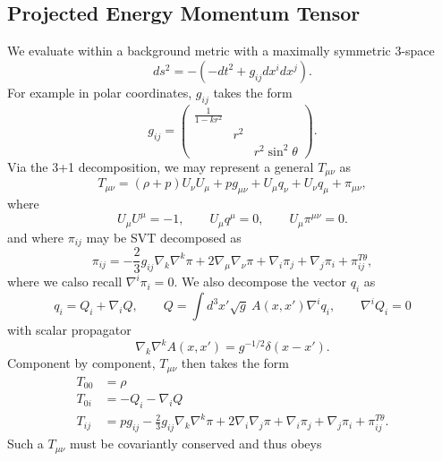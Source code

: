 \documentclass[10pt,letterpaper]{article}
\numberwithin{equation}{subsection}
\begin{document}
\subsection{Projected Energy Momentum Tensor}
We evaluate within a background metric with a maximally symmetric 3-space
\begin{equation}
ds^2 = -( -dt^2 + g_{ij}dx^i dx^j ).
\end{equation}
For example in polar coordinates, $g_{ij}$ takes the form
\begin{equation}
g_{ij} = 
\begin{pmatrix}
\frac{1}{1-kr^2}& & \\
& r^2 & \\
& & r^2\sin^2\theta
\end{pmatrix}.
\end{equation}
Via the 3+1 decomposition, we may represent a general $T_{\mu\nu}$ as
\begin{equation}
T_{\mu\nu} = (\rho+p)U_\nu U_\mu + pg_{\mu\nu} +U_\mu q_\nu + U_\nu q_\mu + \pi_{\mu\nu},
\end{equation}
where
\begin{equation}
U_\mu U^\mu = -1,\qquad U_\mu q^\mu = 0,\qquad U_\mu \pi^{\mu\nu} = 0. 
\end{equation}
and where $\pi_{ij}$ may be SVT decomposed as
\begin{equation}
\pi_{ij} = -\frac{2}{3}g_{ij} \nabla_k \nabla^k \pi + 2\nabla_\mu\nabla_\nu \pi +\nabla_i \pi_j +\nabla_j \pi_i + \pi_{ij}^{T\theta},
\end{equation}
where we calso recall $\nabla^i \pi_i = 0$. We also decompose the vector $q_i$ as
\begin{equation}
q_i = Q_i + \nabla_i Q,\qquad Q = \int d^3x' \sqrt g\ A(x,x') \nabla^i q_i,\qquad \nabla^i Q_i = 0
\end{equation}
with scalar propagator
\begin{equation}
\nabla_k \nabla^k A(x,x') = g^{-1/2} \delta (x-x').
\end{equation}
Component by component, $T_{\mu\nu}$ then takes the form
\begin{align}
T_{00} &= \rho
\nonumber\\
T_{0i} &= -Q_i - \nabla_i Q
\nonumber\\
T_{ij} &= p g_{ij}  -\frac{2}{3}g_{ij} \nabla_k \nabla^k \pi + 2\nabla_i \nabla_j \pi +\nabla_i \pi_j +\nabla_j \pi_i + \pi_{ij}^{T\theta}.
\end{align}
Such a $T_{\mu\nu}$ must be covariantly conserved and thus obeys
\end{document}
